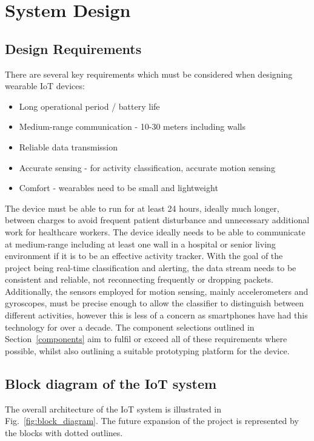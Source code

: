 \documentclass[conference]{IEEEtran}
\begin{document}
\section{System Design}

\subsection{Design Requirements}
There are several key requirements which must be considered when designing wearable IoT devices:
\begin{itemize}
	\item Long operational period / battery life
	\item Medium-range communication - 10-30 meters including walls
	\item Reliable data transmission
	\item Accurate sensing - for activity classification, accurate motion sensing
	\item Comfort - wearables need to be small and lightweight
\end{itemize}

The device must be able to run for at least 24 hours, ideally much longer, between charges to avoid frequent patient disturbance and unnecessary additional work for healthcare workers. The device ideally needs to be able to communicate at medium-range including at least one wall in a hospital or senior living environment if it is to be an effective activity tracker. With the goal of the project being real-time classification and alerting, the data stream needs to be consistent and reliable, not reconnecting frequently or dropping packets. Additionally, the sensors employed for motion sensing, mainly accelerometers and gyroscopes, must be precise enough to allow the classifier to distinguish between different activities, however this is less of a concern as smartphones have had this technology for over a decade. The component selections outlined in Section~\ref{components} aim to fulfil or exceed all of these requirements where possible, whilst also outlining a suitable prototyping platform for the device.

\subsection{Block diagram of the IoT system}
The overall architecture of the IoT system is illustrated in Fig.~\ref{fig:block_diagram}. The future expansion of the project is represented by the blocks with dotted outlines.
\end{document}

